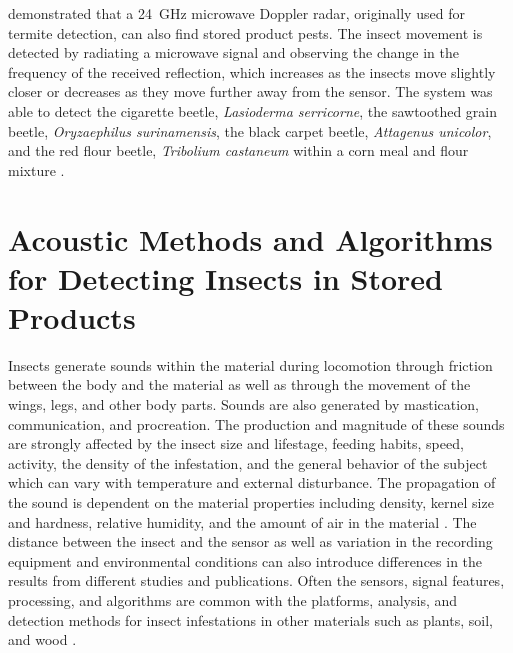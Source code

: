 \citeauthor{mankinMicrowaveRadarDetection2004} demonstrated that a \SI{24}{\giga\hertz} microwave Doppler radar, originally used for termite detection, can also find stored product pests. The insect movement is detected by radiating a microwave signal and observing the change in the frequency of the received reflection, which increases as the insects move slightly closer or decreases as they move further away from the sensor. The system was able to detect the cigarette beetle, \textit{Lasioderma serricorne}, the sawtoothed grain beetle, \textit{Oryzaephilus surinamensis}, the black carpet beetle, \textit{Attagenus unicolor}, and the red flour beetle, \textit{Tribolium castaneum} within a corn meal and flour mixture \cite{mankinMicrowaveRadarDetection2004}.


\section{Acoustic Methods and Algorithms for Detecting Insects in Stored Products}

Insects generate sounds within the material during locomotion through friction between the body and the material as well as through the movement of the wings, legs, and other body parts. Sounds are also generated by mastication, communication, and procreation. The production and magnitude of these sounds are strongly affected by the insect size and lifestage, feeding habits, speed, activity, the density of the infestation, and the general behavior of the subject which can vary with temperature and external disturbance. The propagation of the sound is dependent on the material properties including density, kernel size and hardness, relative humidity, and the amount of air in the material \cite{mankinPerspectivePromiseCentury2011}. The distance between the insect and the sensor as well as variation in the recording equipment and environmental conditions can also introduce differences in the results from different studies and publications. Often the sensors, signal features, processing, and algorithms are common with the platforms, analysis, and detection methods for insect infestations in other materials such as plants, soil, and wood \cite{sutinAutomatedAcousticDetection2019}.

